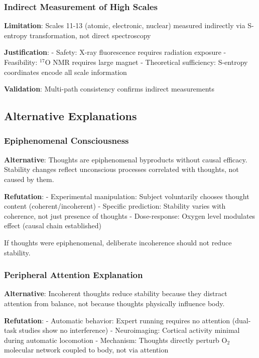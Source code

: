 \documentclass[11pt,onecolumn]{article}
\begin{document}
\subsubsection{Indirect Measurement of High Scales}

\textbf{Limitation}: Scales 11-13 (atomic, electronic, nuclear) measured indirectly via S-entropy transformation, not direct spectroscopy

\textbf{Justification}:
- Safety: X-ray fluorescence requires radiation exposure
- Feasibility: $^{17}$O NMR requires large magnet
- Theoretical sufficiency: S-entropy coordinates encode all scale information

\textbf{Validation}: Multi-path consistency confirms indirect measurements

\subsection{Alternative Explanations}

\subsubsection{Epiphenomenal Consciousness}

\textbf{Alternative}: Thoughts are epiphenomenal byproducts without causal efficacy. Stability changes reflect unconscious processes correlated with thoughts, not caused by them.

\textbf{Refutation}:
- Experimental manipulation: Subject voluntarily chooses thought content (coherent/incoherent)
- Specific prediction: Stability varies with coherence, not just presence of thoughts
- Dose-response: Oxygen level modulates effect (causal chain established)

If thoughts were epiphenomenal, deliberate incoherence should not reduce stability.

\subsubsection{Peripheral Attention Explanation}

\textbf{Alternative}: Incoherent thoughts reduce stability because they distract attention from balance, not because thoughts physically influence body.

\textbf{Refutation}:
- Automatic behavior: Expert running requires no attention (dual-task studies show no interference)
- Neuroimaging: Cortical activity minimal during automatic locomotion
- Mechanism: Thoughts directly perturb O$_2$ molecular network coupled to body, not via attention
\end{document}
